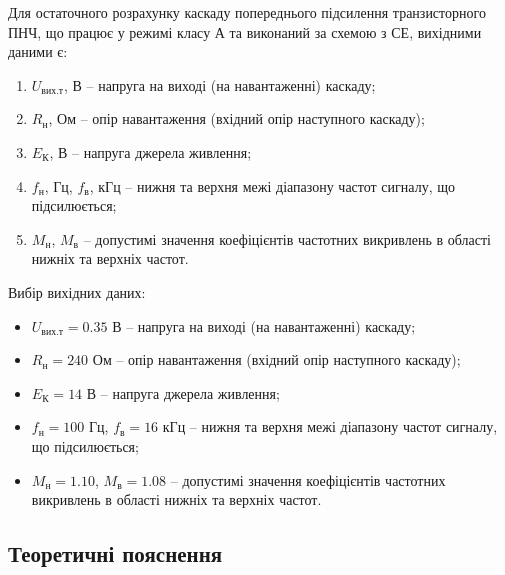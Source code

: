 \documentclass[main.tex]{subfiles}
\begin{document}
Для остаточного розрахунку каскаду попереднього підсилення
транзисторного ПНЧ, що працює у режимі класу А та виконаний за схемою з СЕ,
вихідними даними є:
\begin{enumerate}
    \item $U_{\text{вих.т}}$, В -- напруга на виході (на навантаженні) каскаду;
    \item $R_{\text{н}}$, Ом -- опір навантаження (вхідний опір наступного каскаду);
    \item $E_{\text{К}}$, В -- напруга джерела живлення;
    \item $f_{\text{н}}$, Гц, $f_{\text{в}}$, кГц -- нижня та верхня межі діапазону частот сигналу, що підсилюється;
    \item $M_{\text{н}}$, $M_{\text{в}}$ -- допустимі значення коефіцієнтів частотних викривлень в області нижніх та верхніх частот.
\end{enumerate}

Вибір вихідних даних:
\begin{itemize}
    \item $U_{\text{вих.т}} = 0.35$ В -- напруга на виході (на навантаженні) каскаду;
    \item $R_{\text{н}} = 240$ Ом -- опір навантаження (вхідний опір наступного каскаду);
    \item $E_{\text{К}} = 14$ В -- напруга джерела живлення;
    \item $f_{\text{н}} = 100$ Гц, $f_{\text{в}} = 16$ кГц -- нижня та верхня межі діапазону частот сигналу, що підсилюється;
    \item $M_{\text{н}} = 1.10$, $M_{\text{в}} = 1.08$ -- допустимі значення коефіцієнтів частотних викривлень в області нижніх та верхніх частот.
\end{itemize}


\subsection{Теоретичні пояснення}
\end{document}
